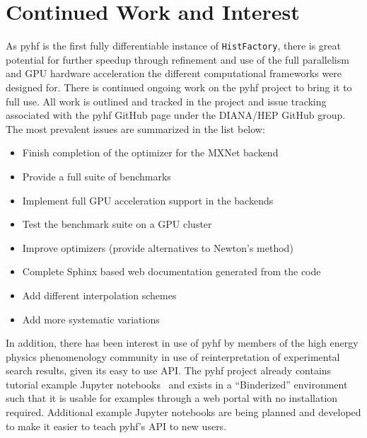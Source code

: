\section{Continued Work and Interest}\label{section:continued_work}

As pyhf is the first fully differentiable instance of \texttt{HistFactory}, there is great potential for further speedup through refinement and use of the full parallelism and GPU hardware acceleration the different computational frameworks were designed for.
There is continued ongoing work on the pyhf project to bring it to full use.
All work is outlined and tracked in the project and issue tracking associated with the pyhf GitHub page under the DIANA/HEP GitHub group.
The most prevalent issues are summarized in the list below:

\begin{itemize}
 \item Finish completion of the optimizer for the MXNet backend
 \item Provide a full suite of benchmarks
 \item Implement full GPU acceleration support in the backends
 \item Test the benchmark suite on a GPU cluster
 \item Improve optimizers (provide alternatives to Newton's method)
 \item Complete Sphinx based web documentation generated from the code
 \item Add different interpolation schemes
 \item Add more systematic variations
\end{itemize}

In addition, there has been interest in use of pyhf by members of the high energy physics phenomenology community in use of reinterpretation of experimental search results, given its easy to use API.
The pyhf project already contains tutorial example Jupyter notebooks~\cite{Kluyver:2016aa} and exists in a ``Binderized'' environment~\cite{Binder} such that it is usable for examples through a web portal with no installation required.
Additional example Jupyter notebooks are being planned and developed to make it easier to teach pyhf's API to new users.
